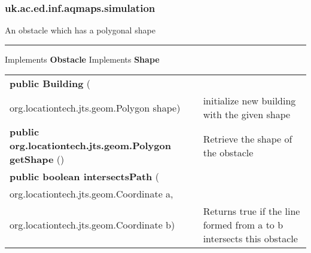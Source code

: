 \subsubsection{ uk.ac.ed.inf.aqmaps.simulation }
 { An obstacle which has a polygonal shape
 
\vspace*{4pt} \hrule \vspace*{3pt}
Implements \textbf{ Obstacle }
Implements \textbf{ Shape }
\begin{tabular}{ p{3in}|m{3.4in}}
\textbf{public Building } (\\ \hspace*{ 5pt} org.locationtech.jts.geom.Polygon shape) & initialize new building with the given shape\\ \hline 
\textbf{public org.locationtech.jts.geom.Polygon getShape} () & Retrieve the shape of the obstacle\\ \hline 
\textbf{public boolean intersectsPath } (\\ \hspace*{ 5pt} org.locationtech.jts.geom.Coordinate a,\\\hspace*{ 5pt} org.locationtech.jts.geom.Coordinate b) & Returns true if the line formed from a to b intersects this obstacle\\ \hline 
\end{tabular}
}
